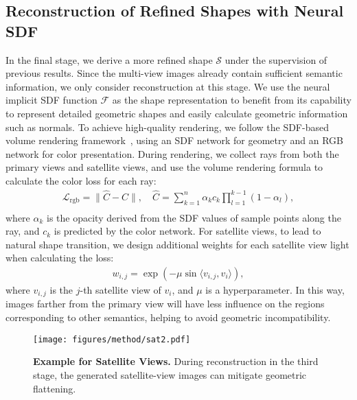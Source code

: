 \subsection{Reconstruction of Refined Shapes with Neural SDF}
\label{3_3}
In the final stage, we derive a more refined shape $\mathcal{S}$ under the supervision of previous results. Since the multi-view images already contain sufficient semantic information, we only consider reconstruction at this stage. We use the neural implicit SDF function $\mathcal{F}$ as the shape representation to benefit from its capability to represent detailed geometric shapes and easily calculate geometric information such as normals. To achieve high-quality rendering, we follow the SDF-based volume rendering framework~\cite{WLL*21, MST*21}, using an SDF network for geometry and an RGB network for color presentation. During rendering, we collect rays from both the primary views and satellite views, and use the volume rendering formula to calculate the color loss for each ray:
\begin{equation}
	\begin{aligned}
		\mathcal{L}_{\mathrm{rgb}} = \|\widehat{C} - C\|
		, \quad
		\widehat{C}=\sum\nolimits_{k=1}^{n} \alpha_{k} c_{k}\prod\nolimits_{l=1}^{k-1}\left(1-\alpha_{l} \right),\\
	\end{aligned}
	\label{eq:nerf}
\end{equation}
where $\alpha_{k}$ is the opacity derived from the SDF values of sample points along the ray, and $c_k$ is predicted by the color network. For satellite views, to lead to natural shape transition, we design additional weights for each satellite view light when calculating the loss:
\begin{equation}
	\begin{aligned}
		w_{i,j}=\exp\left(-\mu\sin\langle v_{i,j},v_i\rangle\right),
	\end{aligned}
\end{equation}
where $v_{i,j}$ is the $j$-th satellite view of $v_i$, and $\mu$ is a hyperparameter. In this way, images farther from the primary view will have less influence on the regions corresponding to other semantics, helping to avoid geometric incompatibility.

\begin{figure}[t]
    \centering
    \texttt{[image: figures/method/sat2.pdf]}
    \caption{\textbf{Example for Satellite Views.} During reconstruction in the third stage, the generated satellite-view images can mitigate geometric flattening.}
    \label{fig:sat}
\end{figure}

